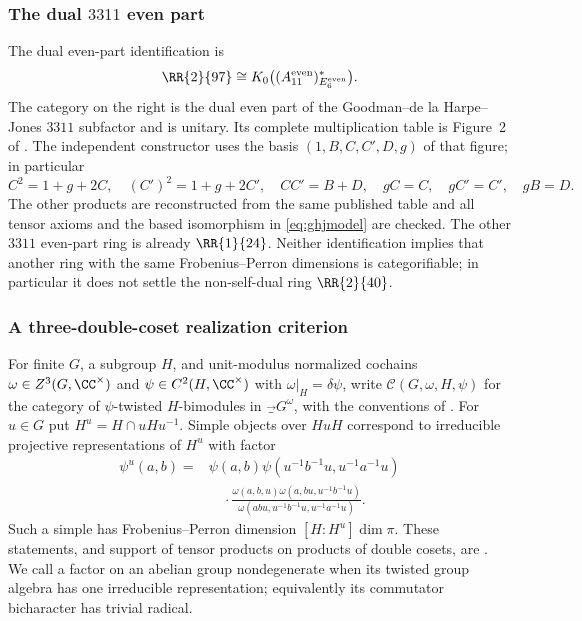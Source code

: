\subsubsection{The dual $3311$ even part}
The dual even-part identification is
\begin{equation}\label{eq:ghjmodel}
 \RR{2}{97}\cong K_0\bigl((A_{11}^{\mathrm{even}})^*_{E_6^{\mathrm{even}}}\bigr).
\end{equation}
The category on the right is the dual even part of the
Goodman--de la Harpe--Jones $3311$ subfactor and is unitary.
Its complete multiplication table is Figure~2 of
\cite[Section~5.1]{IJMS}. The independent constructor uses the basis
$(1,B,C,C',D,g)$ of that figure; in particular
\[
 C^2=1+g+2C,\quad (C')^2=1+g+2C',\quad CC'=B+D,
 \quad gC=C,\quad gC'=C',\quad gB=D.
\]
The other products are reconstructed from the same published table and
all tensor axioms and the based isomorphism in \eqref{eq:ghjmodel} are
checked. The other $3311$ even-part ring is already $\RR{1}{24}$.
Neither identification implies that another ring with the same
Frobenius--Perron dimensions is categorifiable; in particular it does not
settle the non-self-dual ring $\RR{2}{40}$.

\subsubsection{A three-double-coset realization criterion}
For finite $G$, a subgroup $H$, and unit-modulus normalized cochains
$\omega\in Z^3(G,\CC^\times)$ and $\psi\in C^2(H,\CC^\times)$ with
$\omega|_H=\delta\psi$, write $\mathcal C(G,\omega,H,\psi)$ for the
category of $\psi$-twisted $H$-bimodules in $\Vec_G^\omega$, with the
conventions of \cite{GNgt}. For $u\in G$ put $H^u=H\cap uHu^{-1}$.
Simple objects over $HuH$ correspond to irreducible projective
representations of $H^u$ with factor
\begin{align}\label{eq:stabilizer-factor}
 \psi^u(a,b)={}&\psi(a,b)\psi(u^{-1}b^{-1}u,u^{-1}a^{-1}u)\nonumber\\
 &\quad\cdot\frac{\omega(a,b,u)\omega(a,bu,u^{-1}b^{-1}u)}
 {\omega(abu,u^{-1}b^{-1}u,u^{-1}a^{-1}u)}.
\end{align}
Such a simple has Frobenius--Perron dimension
$[H:H^u]\dim\pi$. These statements, and support of tensor products on
products of double cosets, are \cite[Theorems~4.1 and~5.1]{GNgt}.
We call a factor on an abelian group nondegenerate when its twisted group
algebra has one irreducible representation; equivalently its commutator
bicharacter has trivial radical.

